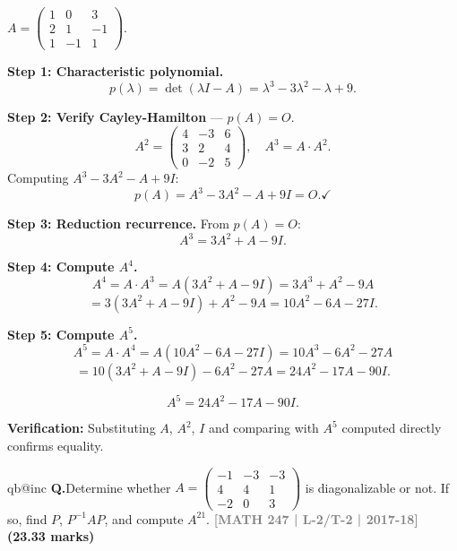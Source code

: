 \documentclass[12pt,a3paper]{article}
\makeatletter
\newcommand{\yr}[1]{\hfill\textcolor{gray}{\small\textbf{[#1]}}}
\newcommand{\mk}[1]{\textcolor{orange!70!black}{\small\textbf{(#1 marks)}}}
\newcounter{qnum}
\newcommand{\Q}[1]{%
  \csname qb@inc\endcsname
  \needspace{4\baselineskip}
  \refstepcounter{qnum}
  \vspace{6pt}
  \noindent\textbf{Q\theqnum.}\enspace #1\par
}
\makeatother
\begin{document}
 
\begin{tcolorbox}[enhanced,breakable,
  colback=cE!4,colframe=cE,boxrule=0.8pt,arc=5pt,
  title={\textbf{Answer --- Cayley-Hamilton Theorem; $A^5$ as Linear Combination}},
  fonttitle=\bfseries\color{white},colbacktitle=cE]

$A=\begin{pmatrix}1&0&3\\2&1&-1\\1&-1&1\end{pmatrix}$.

\textbf{Step 1: Characteristic polynomial.}
\[
p(\lambda)=\det(\lambda I-A)=\lambda^3-3\lambda^2-\lambda+9.
\]

\textbf{Step 2: Verify Cayley-Hamilton} --- $p(A)=O$.
\[
A^2=\begin{pmatrix}4&-3&6\\3&2&4\\0&-2&5\end{pmatrix},\quad
A^3=A\cdot A^2.
\]
Computing $A^3-3A^2-A+9I$:
\[
p(A) = A^3-3A^2-A+9I = O. \checkmark
\]

\textbf{Step 3: Reduction recurrence.} From $p(A)=O$:
\[
A^3 = 3A^2 + A - 9I.
\]

\textbf{Step 4: Compute $A^4$.}
\[
A^4 = A\cdot A^3 = A(3A^2+A-9I) = 3A^3+A^2-9A
\]
\[
= 3(3A^2+A-9I)+A^2-9A = 10A^2-6A-27I.
\]

\textbf{Step 5: Compute $A^5$.}
\[
A^5 = A\cdot A^4 = A(10A^2-6A-27I) = 10A^3-6A^2-27A
\]
\[
= 10(3A^2+A-9I)-6A^2-27A = 24A^2-17A-90I.
\]

\[
\boxed{A^5 = 24A^2 - 17A - 90I.}
\]

\textbf{Verification:} Substituting $A$, $A^2$, $I$ and comparing with $A^5$ computed directly confirms equality. \checkmark

\end{tcolorbox}

\Q{Determine whether $A = \begin{pmatrix} -1 & -3 & -3 \\ 4 & 4 & 1 \\ -2 & 0 & 3 \end{pmatrix}$ is diagonalizable or not. If so, find $P$, $P^{-1}AP$, and compute $A^{21}$.
\yr{MATH 247 | L-2/T-2 | 2017-18} \mk{23.33}}
\end{document}
